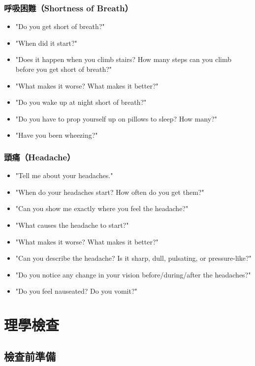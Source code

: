 \documentclass[12pt,a4paper]{article}
\begin{document}
\subsubsection{呼吸困難（Shortness of Breath）}

\begin{itemize}
    \item "Do you get short of breath?"
    \item "When did it start?"
    \item "Does it happen when you climb stairs? How many steps can you climb before you get short of breath?"
    \item "What makes it worse? What makes it better?"
    \item "Do you wake up at night short of breath?"
    \item "Do you have to prop yourself up on pillows to sleep? How many?"
    \item "Have you been wheezing?"
\end{itemize}

\subsubsection{頭痛（Headache）}

\begin{itemize}
    \item "Tell me about your headaches."
    \item "When do your headaches start? How often do you get them?"
    \item "Can you show me exactly where you feel the headache?"
    \item "What causes the headache to start?"
    \item "What makes it worse? What makes it better?"
    \item "Can you describe the headache? Is it sharp, dull, pulsating, or pressure-like?"
    \item "Do you notice any change in your vision before/during/after the headaches?"
    \item "Do you feel nauseated? Do you vomit?"
\end{itemize}

\section{理學檢查}

\subsection{檢查前準備}
\end{document}
